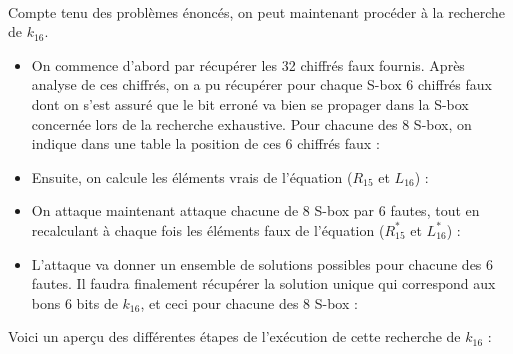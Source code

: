 			\paragraph{} Compte tenu des problèmes énoncés, on peut maintenant procéder à la recherche de $k_{16}$.
			\begin{itemize}
				\item On commence d'abord par récupérer les 32 chiffrés faux fournis. Après analyse de ces chiffrés, on a pu récupérer pour chaque S-box 6 chiffrés faux dont on s'est assuré que le bit erroné va bien se propager dans la S-box concernée lors de la recherche exhaustive. Pour chacune des 8 S-box, on indique dans une table la position de ces 6 chiffrés faux :
				
			
				\item Ensuite, on calcule les éléments vrais de l'équation ($R_{15}$ et $L_{16}$) :
				
			
				\item On attaque maintenant attaque chacune de 8 S-box par 6 fautes, tout en recalculant à chaque fois les éléments faux de l'équation ($R_{15}^{*}$ et $L_{16}^{*}$) :
				
				
				\item L'attaque va donner un ensemble de solutions possibles pour chacune des 6 fautes. Il faudra finalement récupérer la solution unique qui correspond aux bons 6 bits de $k_{16}$, et ceci pour chacune des 8 S-box :
				
			\end{itemize}
			
			Voici un aperçu des différentes étapes de l'exécution de cette recherche de $k_{16}$ :
			
